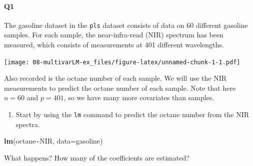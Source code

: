 \documentclass[
]{book}
\newenvironment{Shaded}{\begin{snugshade}}{\end{snugshade}}
\newcommand{\AttributeTok}[1]{\textcolor[rgb]{0.13,0.29,0.53}{#1}}
\newcommand{\DecValTok}[1]{\textcolor[rgb]{0.00,0.00,0.81}{#1}}
\newcommand{\FunctionTok}[1]{\textcolor[rgb]{0.13,0.29,0.53}{\textbf{#1}}}
\newcommand{\NormalTok}[1]{#1}
\newcommand{\SpecialCharTok}[1]{\textcolor[rgb]{0.81,0.36,0.00}{\textbf{#1}}}
\newcommand{\StringTok}[1]{\textcolor[rgb]{0.31,0.60,0.02}{#1}}
\providecommand{\tightlist}{%
  \setlength{\itemsep}{0pt}\setlength{\parskip}{0pt}}
\theoremstyle{definition}
\theoremstyle{definition}
\theoremstyle{definition}
\theoremstyle{definition}
\theoremstyle{remark}
\begin{document}
\hypertarget{q1-1}{%
\paragraph*{Q1}\label{q1-1}}

The gasoline dataset in the \texttt{pls} dataset consists of data on 60 different gasoline samples. For each sample, the near-infra-read (NIR) spectrum has been measured, which consists of measurements at 401 different wavelengths.

\begin{Shaded}
\end{Shaded}

\texttt{[image: 08-multivarLM-ex\_files/figure-latex/unnamed-chunk-1-1.pdf]}

Also recorded is the octane number of each sample. We will use the NIR measurements to predict the octane number of each sample.
Note that here \(n=60\) and \(p=401\), so we have many more covariates than samples.

\begin{enumerate}
\def\labelenumi{\roman{enumi}.}
\tightlist
\item
  Start by using the \texttt{lm} command to predict the octane number from the NIR spectra.
\end{enumerate}

\begin{Shaded}
\begin{Highlighting}[]
\FunctionTok{lm}\NormalTok{(octane}\SpecialCharTok{\textasciitilde{}}\NormalTok{NIR, }\AttributeTok{data=}\NormalTok{gasoline)}
\end{Highlighting}
\end{Shaded}

What happens? How many of the coefficients are estimated?
\end{document}
